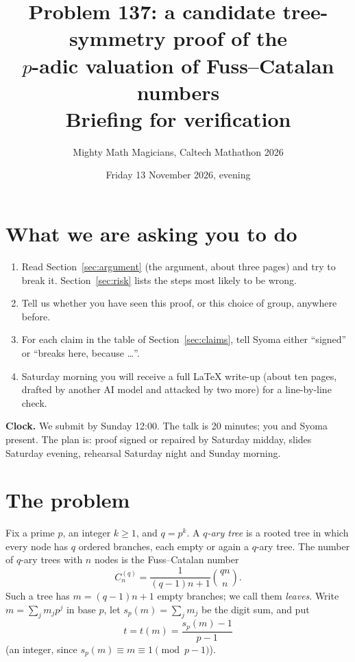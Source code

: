 \documentclass[11pt]{article}
\title{\vspace{-1.5em}Problem 137: a candidate tree-symmetry proof of the\\
$p$-adic valuation of Fuss--Catalan numbers\\[6pt]
\large Briefing for verification}
\author{Mighty Math Magicians, Caltech Mathathon 2026}
\date{Friday 13 November 2026, evening}
\theoremstyle{definition}
\newcommand{\sd}{s_p}
\newcommand{\C}[1]{C^{(q)}_{#1}}
\begin{document}
\maketitle
\vspace{-1em}

\noindent{}

\section{What we are asking you to do}

\begin{enumerate}
\item Read Section~\ref{sec:argument} (the argument, about three pages) and try to break it.
      Section~\ref{sec:risk} lists the steps most likely to be wrong.
\item Tell us whether you have seen this proof, or this choice of group, anywhere before.
\item For each claim in the table of Section~\ref{sec:claims}, tell Syoma either
      ``signed'' or ``breaks here, because \dots''.
\item Saturday morning you will receive a full \LaTeX{} write-up (about ten pages, drafted by
      another AI model and attacked by two more) for a line-by-line check.
\end{enumerate}

\textbf{Clock.} We submit by Sunday 12:00. The talk is 20 minutes; you and Syoma present.
The plan is: proof signed or repaired by Saturday midday, slides Saturday evening,
rehearsal Saturday night and Sunday morning.

\section{The problem}

Fix a prime $p$, an integer $k\ge 1$, and $q=p^k$. A \emph{$q$-ary tree} is a rooted tree in
which every node has $q$ ordered branches, each empty or again a $q$-ary tree. The number of
$q$-ary trees with $n$ nodes is the Fuss--Catalan number
\[
  \C{n}=\frac{1}{(q-1)n+1}\binom{qn}{n}.
\]
Such a tree has $m=(q-1)n+1$ empty branches; we call them \emph{leaves}. Write
$m=\sum_j m_j p^j$ in base $p$, let $\sd(m)=\sum_j m_j$ be the digit sum, and put
\[
  t=t(m)=\frac{\sd(m)-1}{p-1}
\]
(an integer, since $\sd(m)\equiv m\equiv 1 \pmod{p-1}$).
\end{document}
